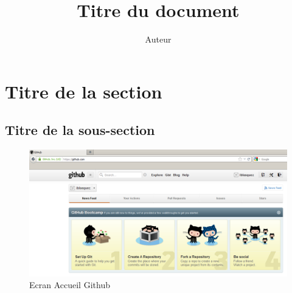 \documentclass{article}
\title{Titre du document}
\author{Auteur}
\begin{document}
  
\maketitle
\tableofcontents
  
\section{Titre de la section}
  
\subsection{Titre de la sous-section}
  
\begin{figure}
  \centering
  \includegraphics[width=0.48\linewidth]{AccueilGithubPourTutoGit}
  \caption{Ecran Accueil Github}
\end{figure}
  
\end{document}
